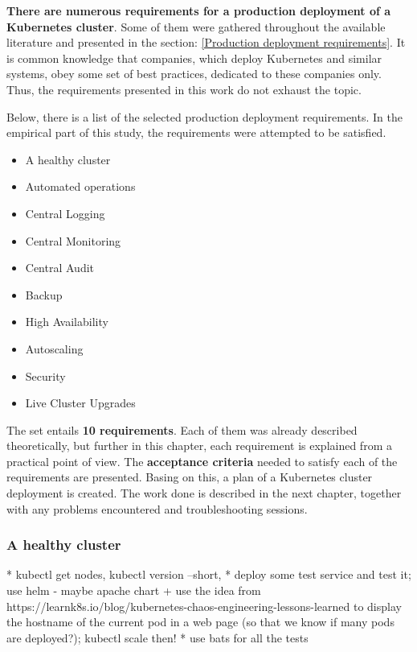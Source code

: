 \textbf{There are numerous requirements for a production deployment of a Kubernetes cluster}. Some of them were gathered throughout the available literature and presented in the section: \ref{Production deployment requirements}. It is common knowledge that companies, which deploy Kubernetes and similar systems, obey some set of best practices, dedicated to these companies only. Thus, the requirements presented in this work do not exhaust the topic.

Below, there is a list of the selected production deployment requirements. In the empirical part of this study, the requirements were  attempted to be satisfied.
\begin{itemize}
\item A healthy cluster
\item Automated operations
\item Central Logging
\item Central Monitoring
\item Central Audit
\item Backup
\item High Availability
\item Autoscaling
\item Security
\item Live Cluster Upgrades
\end{itemize}

The set entails \textbf{10 requirements}. Each of them was already described theoretically, but further in this chapter, each requirement is explained from a practical point of view. The \textbf{acceptance criteria} needed to satisfy each of the requirements are presented. Basing on this, a plan of a Kubernetes cluster deployment is created. The work done is described in the next chapter, together with any problems encountered and troubleshooting sessions.

\subsubsection{A healthy cluster}
\label{A healthy cluster}
* kubectl get nodes, kubectl version --short,
* deploy some test service and test it; use helm - maybe apache chart + use the idea from https://learnk8s.io/blog/kubernetes-chaos-engineering-lessons-learned to display the hostname of the current pod in a web page (so that we know if many pods are deployed?); kubectl scale then!
* use bats for all the tests



